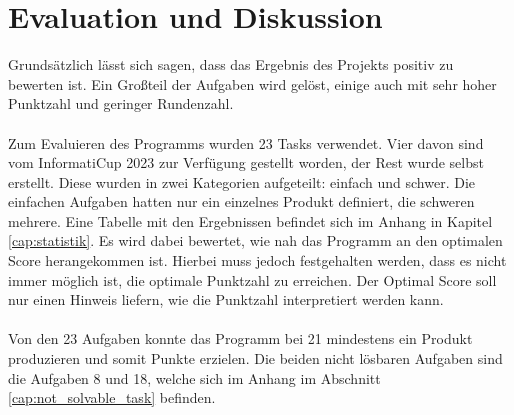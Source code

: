 \section{Evaluation und Diskussion}\label{cap:evaluation}
Grundsätzlich lässt sich sagen, dass das Ergebnis des Projekts positiv zu bewerten ist. Ein Großteil der Aufgaben wird gelöst, einige auch mit sehr hoher Punktzahl und geringer Rundenzahl.
\\\\
Zum Evaluieren des Programms wurden 23 Tasks verwendet. Vier davon sind vom InformatiCup 2023 zur Verfügung gestellt worden, der Rest wurde selbst erstellt. Diese wurden in zwei Kategorien aufgeteilt: einfach und schwer. Die einfachen Aufgaben hatten nur ein einzelnes Produkt definiert, die schweren mehrere. Eine Tabelle mit den Ergebnissen befindet sich im Anhang in Kapitel \ref{cap:statistik}. Es wird dabei bewertet, wie nah das Programm an den optimalen Score herangekommen ist. Hierbei muss jedoch festgehalten werden, dass es nicht immer möglich ist, die optimale Punktzahl zu erreichen. Der Optimal Score soll nur einen Hinweis liefern, wie die Punktzahl interpretiert werden kann. 
\\\\
Von den 23 Aufgaben konnte das Programm bei 21 mindestens ein Produkt produzieren und somit Punkte erzielen. Die beiden nicht lösbaren Aufgaben sind die Aufgaben 8 und 18, welche sich im Anhang im Abschnitt \ref{cap:not_solvable_task} befinden.


